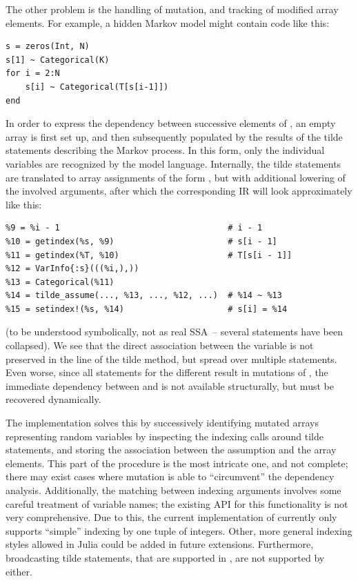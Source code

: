 The other problem is the handling of mutation, and tracking of modified array elements.  For
example, a hidden Markov model might contain code like this:
\begin{lstlisting}
s = zeros(Int, N)
s[1] ~ Categorical(K)
for i = 2:N
    s[i] ~ Categorical(T[s[i-1]])
end
\end{lstlisting}
In order to express the dependency between successive elements of , an empty array is first
set up, and then subsequently populated by the results of the tilde statements describing the Markov
process.  In this form, only the individual variables  are recognized by the model
language.  Internally, the tilde statements are translated to array assignments of the form
, but with additional lowering of the involved arguments, after
which the corresponding IR will look approximately like this:
\begin{lstlisting}
%9 = %i - 1                                  # i - 1
%10 = getindex(%s, %9)                       # s[i - 1]
%11 = getindex(%T, %10)                      # T[s[i - 1]]
%12 = VarInfo{:s}(((%i,),))
%13 = Categorical(%11)
%14 = tilde_assume(..., %13, ..., %12, ...)  # %14 ~ %13
%15 = setindex!(%s, %14)                     # s[i] = %14
\end{lstlisting}
(to be understood symbolically, not as real SSA~-- several statements have been collapsed).  We see
that the direct association between the variable  is not preserved in the line of the tilde
method, but spread over multiple statements. Even worse, since all statements for the different
 result in mutations of , the immediate dependency between  and
 is not available structurally, but must be recovered dynamically.

The  implementation solves this by successively identifying mutated arrays
representing random variables by inspecting the indexing calls around tilde statements, and storing
the association between the assumption and the array elements.  This part of the procedure is the
most intricate one, and not complete; there may exist cases where mutation is able to
\enquote{circumvent} the dependency analysis.  Additionally, the matching between indexing arguments
involves some careful treatment of variable names; the existing \dppljl{} API for this functionality
is not very comprehensive.  Due to this, the current implementation of \autogibbsjl{} currently only
supports \enquote{simple} indexing by one tuple of integers.  Other, more general indexing styles
allowed in Julia could be added in future extensions.  Furthermore, broadcasting tilde statements,
that are supported in \dppljl{}, are not supported by \autogibbsjl{} either.

